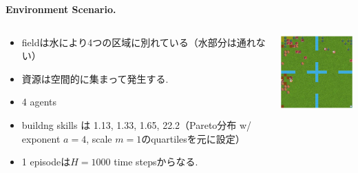 \documentclass[unicode,aspectratio=169,11pt]{beamer}
\begin{document}
\begin{frame}{}{}
{\bf Environment Scenario.}
\begin{columns}[t]
    \begin{column}{0.6\textwidth}
        \begin{itemize}
            \item fieldは水により4つの区域に別れている（水部分は通れない）
            \item 資源は空間的に集まって発生する.
            \item 4 agents
            \item buildng skills は 1.13, 1.33, 1.65, 22.2（Pareto分布 w/ exponent $a=4$, scale $m=1$のquartilesを元に設定）
            \item 1 episodeは$H = 1000$ time stepsからなる.
        \end{itemize}
    \end{column}
    \begin{column}{0.4\textwidth}
        \begin{center}
            \includegraphics[width=5cm]{figure1.png}
        \end{center}
    \end{column}
\end{columns}
\end{frame}
\end{document}
